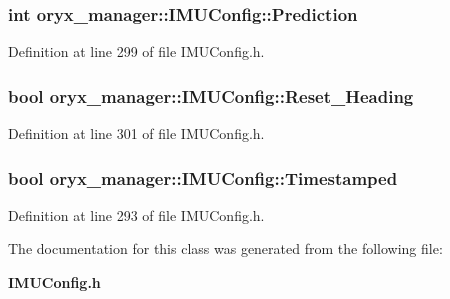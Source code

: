 \subsubsection[{\-Prediction}]{\setlength{\rightskip}{0pt plus 5cm}int {\bf oryx\-\_\-manager\-::\-I\-M\-U\-Config\-::\-Prediction}}\label{classoryx__manager_1_1IMUConfig_ae44db953680cf07b09b58720b29fda81}


\-Definition at line 299 of file \-I\-M\-U\-Config.\-h.

\subsubsection[{\-Reset\-\_\-\-Heading}]{\setlength{\rightskip}{0pt plus 5cm}bool {\bf oryx\-\_\-manager\-::\-I\-M\-U\-Config\-::\-Reset\-\_\-\-Heading}}\label{classoryx__manager_1_1IMUConfig_a523c1d9e072cd588c1c56c4c4fa690f7}


\-Definition at line 301 of file \-I\-M\-U\-Config.\-h.

\subsubsection[{\-Timestamped}]{\setlength{\rightskip}{0pt plus 5cm}bool {\bf oryx\-\_\-manager\-::\-I\-M\-U\-Config\-::\-Timestamped}}\label{classoryx__manager_1_1IMUConfig_a688ef802cd02416d3ed1095c0e274dca}


\-Definition at line 293 of file \-I\-M\-U\-Config.\-h.



\-The documentation for this class was generated from the following file\-:\begin{DoxyCompactItemize}
\item 
{\bf \-I\-M\-U\-Config.\-h}\end{DoxyCompactItemize}
